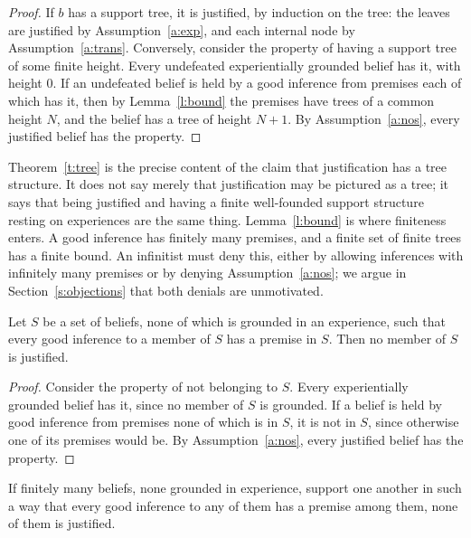 \documentclass{situationist-preprint}
\begin{document}
\begin{proof}
If $b$ has a support tree, it is justified, by induction on the tree: the leaves are justified by Assumption~\ref{a:exp}, and each internal node by Assumption~\ref{a:trans}. Conversely, consider the property of having a support tree of some finite height. Every undefeated experientially grounded belief has it, with height $0$. If an undefeated belief is held by a good inference from premises each of which has it, then by Lemma~\ref{l:bound} the premises have trees of a common height $N$, and the belief has a tree of height $N+1$. By Assumption~\ref{a:nos}, every justified belief has the property.
\end{proof}

Theorem~\ref{t:tree} is the precise content of the claim that justification has a tree structure. It does not say merely that justification may be pictured as a tree; it says that being justified and having a finite well-founded support structure resting on experiences are the same thing. Lemma~\ref{l:bound} is where finiteness enters. A good inference has finitely many premises, and a finite set of finite trees has a finite bound. An infinitist must deny this, either by allowing inferences with infinitely many premises or by denying Assumption~\ref{a:nos}; we argue in Section~\ref{s:objections} that both denials are unmotivated.

\begin{theorem}\label{t:rootless}
Let $S$ be a set of beliefs, none of which is grounded in an experience, such that every good inference to a member of $S$ has a premise in $S$. Then no member of $S$ is justified.
\end{theorem}

\begin{proof}
Consider the property of not belonging to $S$. Every experientially grounded belief has it, since no member of $S$ is grounded. If a belief is held by good inference from premises none of which is in $S$, it is not in $S$, since otherwise one of its premises would be. By Assumption~\ref{a:nos}, every justified belief has the property.
\end{proof}

\begin{corollary}[Circles]\label{c:circle}
If finitely many beliefs, none grounded in experience, support one another in such a way that every good inference to any of them has a premise among them, none of them is justified.
\end{corollary}
\end{document}

